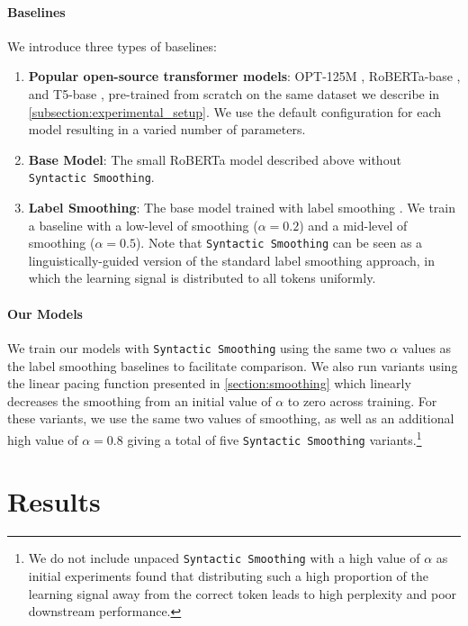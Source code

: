 \paragraph{Baselines}

We introduce three types of baselines: 
\begin{enumerate}
    \item \textbf{Popular open-source transformer models}: OPT-125M \citep{zhang2022opt}, RoBERTa-base \citep{liu2019roberta}, and T5-base \citep{raffel2020t5}, pre-trained from scratch on the same dataset we describe in \cref{subsection:experimental_setup}. We use the default configuration for each model resulting in a varied number of parameters.
    \item \textbf{Base Model}: The small RoBERTa model described above without \texttt{Syntactic Smoothing}.
    \item \textbf{Label Smoothing}: The base model trained with label smoothing \citep{szegedy2016rethinking}.  We train a baseline with a low-level of smoothing ($\alpha=0.2$) and a mid-level of smoothing ($\alpha=0.5$). Note that \texttt{Syntactic Smoothing} can be seen as a linguistically-guided version of the standard label smoothing approach, in which the learning signal is distributed to all tokens uniformly.
\end{enumerate}

\paragraph{Our Models} We train our models with \texttt{Syntactic Smoothing} using the same two $\alpha$ values as the label smoothing baselines to facilitate comparison. We also run variants using the linear pacing function presented in \cref{section:smoothing} which linearly decreases the smoothing from an initial value of $\alpha$ to zero across training. For these variants, we use the same two values of smoothing, as well as an additional high value of $\alpha=0.8$ giving a total of five \texttt{Syntactic Smoothing} variants.\footnote{We do not include unpaced \texttt{Syntactic Smoothing} with a high value of $\alpha$ as initial experiments found that distributing such a high proportion of the learning signal away from the correct token leads to high perplexity and poor downstream performance.}

\section{Results}
\label{sec:results}

